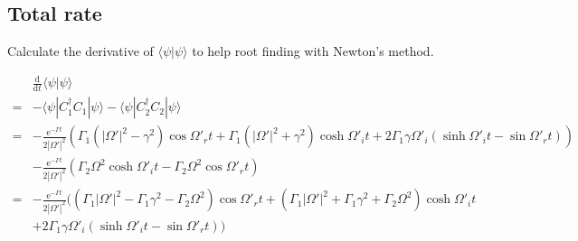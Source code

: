 \documentclass[10pt,fleqn]{article}
\newcommand{\ud}{\mathrm{d}}
\newcommand{\ue}{\mathrm{e}}
\newcommand{\eqar}[1]
{
  \begin{align*}
    #1
  \end{align*}
}
\newcommand{\paren}[1]{{\left({#1}\right)}}
\newcommand{\abs}[1]{{\left|{#1}\right|}}
\newcommand{\diff}[3][{}]{{\frac{\ud^{#1} {#2}}{\ud {#3}{}^{#1}}}}
\begin{document}
\subsection{Total rate}
Calculate the derivative of $\langle\psi|\psi\rangle$ to help root finding with Newton's method.
\eqar{
  &\diff{}{t}\langle\psi|\psi\rangle\\
  =&-\langle\psi|C_1^\dagger C_1|\psi\rangle-\langle\psi|C_2^\dagger C_2|\psi\rangle\\
  =&-\frac{\ue^{-\Gamma t}}{2\abs{\Omega'}^2}\paren{
    \Gamma_1\paren{\abs{\Omega'}^2-\gamma^2}\cos\Omega'_rt
    +\Gamma_1\paren{\abs{\Omega'}^2+\gamma^2}\cosh\Omega'_it
    +2\Gamma_1\gamma\Omega'_i\paren{\sinh\Omega'_it-\sin\Omega'_rt}
  }\\
  &-\frac{\ue^{-\Gamma t}}{2\abs{\Omega'}^2}\paren{\Gamma_2\Omega^2\cosh\Omega'_it-\Gamma_2\Omega^2\cos\Omega'_rt}\\
  =&-\frac{\ue^{-\Gamma t}}{2\abs{\Omega'}^2}\Bigg(
  \paren{\Gamma_1\abs{\Omega'}^2-\Gamma_1\gamma^2-\Gamma_2\Omega^2}\cos\Omega'_rt
  +\paren{\Gamma_1\abs{\Omega'}^2+\Gamma_1\gamma^2+\Gamma_2\Omega^2}\cosh\Omega'_it\\
  &+2\Gamma_1\gamma\Omega'_i\paren{\sinh\Omega'_it-\sin\Omega'_rt}\Bigg)
}
\end{document}
